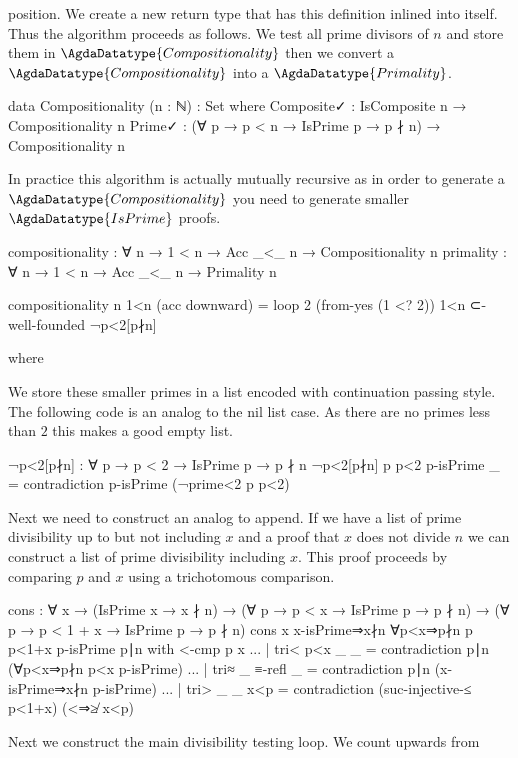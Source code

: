 \documentclass[./Thesis.tex]{subfiles}
\begin{document}
position. We create a new return type that has this definition inlined into
itself. Thus the algorithm proceeds as follows. We test all prime divisors of
$n$ and store them in $\AgdaDatatype{Compositionality}$ then we convert a
$\AgdaDatatype{Compositionality}$ into a $\AgdaDatatype{Primality}$.
\begin{code}
  data Compositionality (n : ℕ) : Set where
    Composite✓ : IsComposite n → Compositionality n
    Prime✓ : (∀ {p} → p < n → IsPrime p → p ∤ n) → Compositionality n
\end{code}
In practice this algorithm is actually mutually recursive as in order to generate
a $\AgdaDatatype{Compositionality}$ you need to generate smaller
$\AgdaDatatype{IsPrime}$ proofs.
\begin{code}
  compositionality : ∀ n → 1 < n → Acc _<_ n → Compositionality n
  primality : ∀ n → 1 < n → Acc _<_ n → Primality n
\end{code}
\begin{code}
  compositionality n 1<n (acc downward)
    = loop 2 (from-yes (1 <? 2)) 1<n ⊂-well-founded ¬p<2[p∤n]
\end{code}
\begin{code}[hide]
    where
\end{code}
We store these smaller primes in a list encoded with continuation passing style.
The following code is an analog to the nil list case. As there are no primes
less than $2$ this makes a good empty list.
\begin{code}
    ¬p<2[p∤n] : ∀ {p} → p < 2 → IsPrime p → p ∤ n
    ¬p<2[p∤n] {p} p<2 p-isPrime _ = contradiction p-isPrime (¬prime<2 p p<2)
\end{code}
Next we need to construct an analog to append. If we have a list of prime
divisibility up to but not including $x$ and a proof that $x$ does not
divide $n$ we can construct a list of prime divisibility including $x$. This
proof proceeds by comparing $p$ and $x$ using a trichotomous comparison.
\begin{code}
    cons
      : ∀ {x}
      → (IsPrime x → x ∤ n)
      → (∀ {p} → p < x → IsPrime p → p ∤ n)
      → (∀ {p} → p < 1 + x → IsPrime p → p ∤ n)
    cons {x} x-isPrime⇒x∤n ∀p<x⇒p∤n {p} p<1+x p-isPrime p∣n with <-cmp p x
    ... | tri< p<x _ _ = contradiction p∣n (∀p<x⇒p∤n p<x p-isPrime)
    ... | tri≈ _ ≡-refl _ = contradiction p∣n (x-isPrime⇒x∤n p-isPrime)
    ... | tri> _ _ x<p = contradiction (suc-injective-≤ p<1+x) (<⇒≱ x<p)
\end{code}
Next we construct the main divisibility testing loop. We count upwards from
\end{document}
